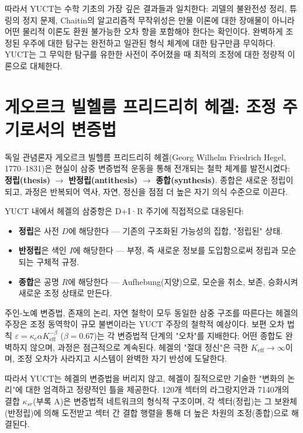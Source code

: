 \documentclass[12pt,a4paper]{article}
\begin{document}
	따라서 YUCT는 수학 기초의 가장 깊은 결과들과 일치한다: 괴델의 불완전성 정리, 튜링의 정지 문제, Chaitin의 알고리즘적 무작위성은 만물 이론에 대한 장애물이 아니라 어떤 물리적 이론도 환원 불가능한 오차 항을 포함해야 한다는 확인이다. 완벽하게 조정된 우주에 대한 탐구는 완전하고 일관된 형식 체계에 대한 탐구만큼 무익하다. YUCT는 그 무익한 탐구를 유한한 사전이 주어졌을 때 최적의 조정에 대한 정량적 이론으로 대체한다.
	
	\section{게오르크 빌헬름 프리드리히 헤겔: 조정 주기로서의 변증법}
	
	독일 관념론자 게오르크 빌헬름 프리드리히 헤겔(Georg Wilhelm Friedrich Hegel, 1770–1831)은 현실이 삼중 변증법적 운동을 통해 전개되는 철학 체계를 발전시켰다: \textbf{정립(thesis)} \(\to\) \textbf{반정립(antithesis)} \(\to\) \textbf{종합(synthesis)}. 종합은 새로운 정립이 되고, 과정은 반복되어 역사, 자연, 정신을 점점 더 높은 자기 의식 수준으로 이끈다.
	
	YUCT 내에서 헤겔의 삼중항은 D+I·R 주기에 직접적으로 대응된다:
	\begin{itemize}
		\item \textbf{정립}은 사전 \(D\)에 해당한다 — 기존의 구조화된 가능성의 집합, "정립된" 상태.
		\item \textbf{반정립}은 색인 \(I\)에 해당한다 — 부정, 즉 새로운 정보를 도입함으로써 정립과 모순되는 구체적 규정.
		\item \textbf{종합}은 공명 \(R\)에 해당한다 — Aufhebung(지양)으로, 모순을 취소, 보존, 승화시켜 새로운 조정 상태로 만든다.
	\end{itemize}
	
	주인-노예 변증법, 존재의 논리, 자연 철학이 모두 동일한 삼중 구조를 따른다는 헤겔의 주장은 조정 동역학이 규모 불변이라는 YUCT 주장의 철학적 예상이다. 보편 오차 법칙 \(\varepsilon = \kappa_c \alpha K_{\mathrm{eff}}^{-\beta}\) (\(\beta=0.67\))는 각 변증법적 단계의 "오차"를 지배한다; 어떤 종합도 완벽하지 않으며, 과정은 점근적으로 계속된다. 헤겔의 "절대 정신"은 극한 \(K_{\mathrm{eff}} \to \infty\)이며, 조정 오차가 사라지고 시스템이 완벽한 자기 반성에 도달한다.
	
	따라서 YUCT는 헤겔의 변증법을 버리지 않고, 헤겔이 질적으로만 기술한 "변화의 논리"에 대한 엄격하고 정량적인 틀을 제공한다. 120개 섹터의 라그랑지안과 7140개의 결합 \(\kappa_{sr}\)(부록 A)은 변증법적 네트워크의 형식적 구조이며, 각 섹터(정립)는 그 보완체(반정립)에 의해 도전받고 섹터 간 결합 행렬을 통해 더 높은 차원의 조정(종합)으로 해결된다.
	
\end{document}

